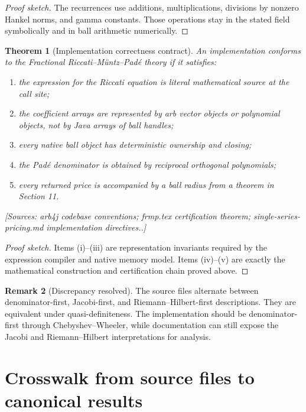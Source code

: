 \documentclass[11pt]{article}
\newtheorem{theorem}{Theorem}[section]
\theoremstyle{definition}
\newtheorem{remark}[theorem]{Remark}
\newcommand{\Source}[1]{\par\smallskip\noindent\textup{[Sources: #1.]}}
\begin{document}
\begin{proof}[Proof sketch]
The recurrences use additions,
multiplications,
divisions by nonzero Hankel norms,
and gamma constants.
Those operations stay in the stated field symbolically and in ball arithmetic numerically.
\end{proof}

\begin{theorem}[Implementation correctness contract]\label{thm:implementation-contract}
An implementation conforms to the Fractional Riccati--Müntz--Padé theory if it satisfies:
\begin{enumerate}[label=(\roman*)]
\item the expression for the Riccati equation is literal mathematical source at the call site;
\item the coefficient arrays are represented by arb vector objects or polynomial objects, not by Java arrays of ball handles;
\item every native ball object has deterministic ownership and closing;
\item the Padé denominator is obtained by reciprocal orthogonal polynomials;
\item every returned price is accompanied by a ball radius from a theorem in Section 11.
\end{enumerate}
\Source{arb4j codebase conventions; frmp.tex certification theorem; single-series-pricing.md implementation directives.}
\end{theorem}

\begin{proof}[Proof sketch]
Items (i)--(iii) are representation invariants required by the expression compiler and native memory model.
Items (iv)--(v) are exactly the mathematical construction and certification chain proved above.
\end{proof}

\begin{remark}[Discrepancy resolved]
The source files alternate between denominator-first,
Jacobi-first,
and Riemann--Hilbert-first descriptions.
They are equivalent under quasi-definiteness.
The implementation should be denominator-first through Chebyshev--Wheeler,
while documentation can still expose the Jacobi and Riemann--Hilbert interpretations for analysis.
\end{remark}

\appendix
\section{Crosswalk from source files to canonical results}
\end{document}
